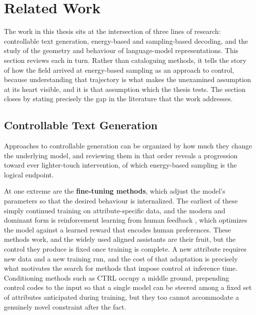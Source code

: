 \section{Related Work}
\label{ch:related}

The work in this thesis sits at the intersection of three lines of research: controllable text generation, energy-based and sampling-based decoding, and the study of the geometry and behaviour of language-model representations. This section reviews each in turn. Rather than cataloguing methods, it tells the story of how the field arrived at energy-based sampling as an approach to control, because understanding that trajectory is what makes the unexamined assumption at its heart visible, and it is that assumption which the thesis tests. The section closes by stating precisely the gap in the literature that the work addresses.

\subsection{Controllable Text Generation}
\label{sec:rel-ctg}

Approaches to controllable generation can be organized by how much they change the underlying model, and reviewing them in that order reveals a progression toward ever lighter-touch intervention, of which energy-based sampling is the logical endpoint.

At one extreme are the \textbf{fine-tuning methods}, which adjust the model's parameters so that the desired behaviour is internalized. The earliest of these simply continued training on attribute-specific data, and the modern and dominant form is reinforcement learning from human feedback \citep{ouyang2022training}, which optimizes the model against a learned reward that encodes human preferences. These methods work, and the widely used aligned assistants are their fruit, but the control they produce is fixed once training is complete. A new attribute requires new data and a new training run, and the cost of that adaptation is precisely what motivates the search for methods that impose control at inference time. Conditioning methods such as CTRL \citep{keskar2019ctrl} occupy a middle ground, prepending control codes to the input so that a single model can be steered among a fixed set of attributes anticipated during training, but they too cannot accommodate a genuinely novel constraint after the fact.

